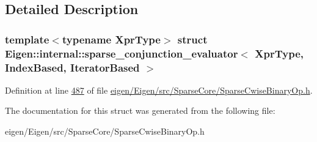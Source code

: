 \subsection{Detailed Description}
\subsubsection*{template$<$typename Xpr\+Type$>$\newline
struct Eigen\+::internal\+::sparse\+\_\+conjunction\+\_\+evaluator$<$ Xpr\+Type, Index\+Based, Iterator\+Based $>$}



Definition at line \hyperlink{eigen_2_eigen_2src_2_sparse_core_2_sparse_cwise_binary_op_8h_source_l00487}{487} of file \hyperlink{eigen_2_eigen_2src_2_sparse_core_2_sparse_cwise_binary_op_8h_source}{eigen/\+Eigen/src/\+Sparse\+Core/\+Sparse\+Cwise\+Binary\+Op.\+h}.



The documentation for this struct was generated from the following file\+:\begin{DoxyCompactItemize}
\item 
eigen/\+Eigen/src/\+Sparse\+Core/\+Sparse\+Cwise\+Binary\+Op.\+h\end{DoxyCompactItemize}

